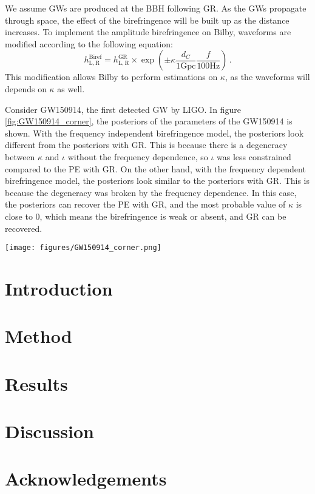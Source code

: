 \documentclass[twocolumn]{aastex631}
\begin{document}
We assume GWs are produced at the BBH following GR. As the GWs propagate through space,
the effect of the birefringence will be built up as the distance increases.
To implement the amplitude birefringence on Bilby, waveforms are modified according to the following equation:
\begin{equation}
    h_\mathrm{L,R}^{\mathrm{Biref}}=
    h_\mathrm{L,R}^{\mathrm{GR}}\times
    \exp\left(\pm\kappa\frac{d_C}{1\mathrm{ Gpc}}\frac{f}{100\mathrm{ Hz}}\right)\,.
\end{equation}
This modification allows Bilby to perform estimations on $\kappa$, as the waveforms will depends on $\kappa$ as well.

Consider GW150914, the first detected GW by LIGO. In figure \ref{fig:GW150914_corner}, the posteriors of the parameters of the GW150914 is shown.
With the frequency independent birefringence model, the posteriors look different from the posteriors with GR.
This is because there is a degeneracy between $\kappa$ and $\iota$ without the frequency dependence,
so $\iota$ was less constrained compared to the PE with GR.
On the other hand, with the frequency dependent birefringence model, the posteriors look similar to the posteriors with GR.
This is because the degeneracy was broken by the frequency dependence. In this case, the posteriors can recover the PE with GR,
and the most probable value of $\kappa$ is close to 0, which means the birefringence is weak or absent, and GR can be recovered.

\begin{figure*}[h]
    \texttt{[image: figures/GW150914\_corner.png]}
    \caption{The posterior of $\kappa$, luminosity distance $d_L$ and $\cos{\iota}$ for GW150914.
    The three sets of plots are the parameter estimations (PE) done by LIGO with GR \citep{LIGO_2021},
    the PE done by us with the frequency independent birefringence and the frequency dependent birefringence respectively.
    Note that there is no posterior of $\kappa$ for the PE from LIGO, as the LIGO PE is based on GR,
    which does not suggest GWs amplitude birefringence.}
    \label{fig:GW150914_corner}
\end{figure*}

\section{Introduction}



\section{Method}



\section{Results}



\section{Discussion}



\section{Acknowledgements}




\end{document}
